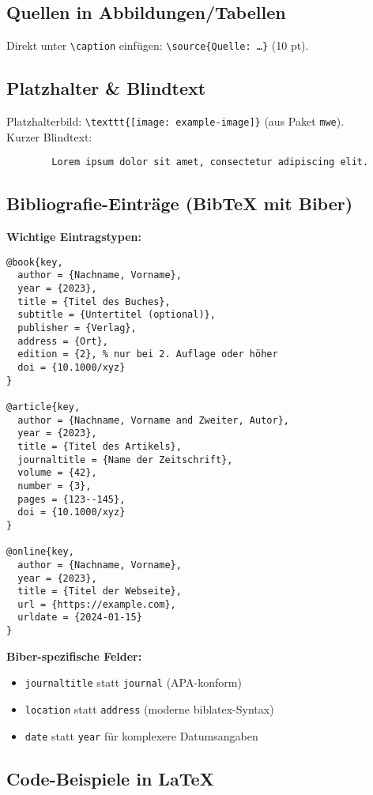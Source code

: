 \documentclass[11pt,a4paper]{article}
\makeatletter
\newcommand{\source}[1]{\caption*{\footnotesize #1}} %
\renewcommand\footnotesize{\@setfontsize\footnotesize{10pt}{12pt}}
\makeatother
\begin{document}
    \subsection*{Quellen in Abbildungen/Tabellen}
    Direkt unter \verb|\caption| einfügen: \verb|\source{Quelle: …}| (10 pt).

    \subsection*{Platzhalter \& Blindtext}
    Platzhalterbild: \verb|\texttt{[image: example-image]}| (aus Paket \verb|mwe|).\\
    Kurzer Blindtext:
    \begin{verbatim}
        Lorem ipsum dolor sit amet, consectetur adipiscing elit.
    \end{verbatim}

    \subsection*{Bibliografie-Einträge (BibTeX mit Biber)}
    \textbf{Wichtige Eintragstypen:}
    \begin{verbatim}
@book{key,
  author = {Nachname, Vorname},
  year = {2023},
  title = {Titel des Buches},
  subtitle = {Untertitel (optional)},
  publisher = {Verlag},
  address = {Ort},
  edition = {2}, % nur bei 2. Auflage oder höher
  doi = {10.1000/xyz}
}

@article{key,
  author = {Nachname, Vorname and Zweiter, Autor},
  year = {2023},
  title = {Titel des Artikels},
  journaltitle = {Name der Zeitschrift},
  volume = {42},
  number = {3},
  pages = {123--145},
  doi = {10.1000/xyz}
}

@online{key,
  author = {Nachname, Vorname},
  year = {2023},
  title = {Titel der Webseite},
  url = {https://example.com},
  urldate = {2024-01-15}
}
    \end{verbatim}

    \textbf{Biber-spezifische Felder:}
    \begin{itemize}
        \item \verb|journaltitle| statt \verb|journal| (APA-konform)
        \item \verb|location| statt \verb|address| (moderne biblatex-Syntax)
        \item \verb|date| statt \verb|year| für komplexere Datumsangaben
    \end{itemize}

\subsection*{Code-Beispiele in LaTeX}
\end{document}
